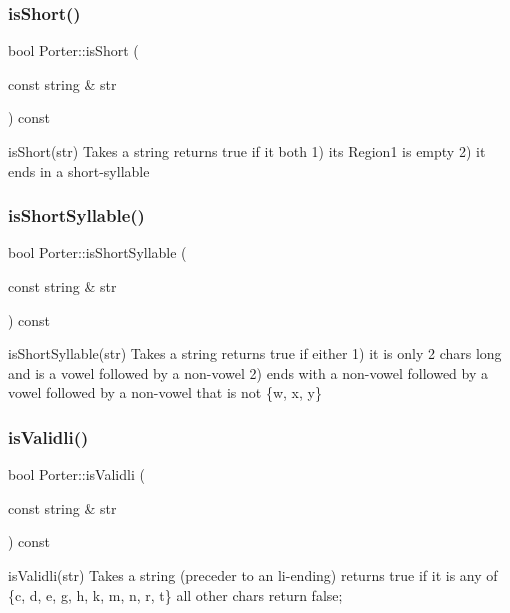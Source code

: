 \subsubsection{\texorpdfstring{is\+Short()}{isShort()}}
{\footnotesize\ttfamily bool Porter\+::is\+Short (\begin{DoxyParamCaption}\item[{const string \&}]{str }\end{DoxyParamCaption}) const}

is\+Short(str) Takes a string returns true if it both 1) its Region1 is empty 2) it ends in a short-\/syllable \mbox{\label{classPorter_a36e6678f68a4cc29371cc0111a8c8860}} 
\subsubsection{\texorpdfstring{is\+Short\+Syllable()}{isShortSyllable()}}
{\footnotesize\ttfamily bool Porter\+::is\+Short\+Syllable (\begin{DoxyParamCaption}\item[{const string \&}]{str }\end{DoxyParamCaption}) const}

is\+Short\+Syllable(str) Takes a string returns true if either 1) it is only 2 chars long and is a vowel followed by a non-\/vowel 2) ends with a non-\/vowel followed by a vowel followed by a non-\/vowel that is not \{\textquotesingle{}w\textquotesingle{}, \textquotesingle{}x\textquotesingle{}, \textquotesingle{}y\textquotesingle{}\} \mbox{\label{classPorter_ac53ad85d5d3178b72178a4d89137b55e}} 
\subsubsection{\texorpdfstring{is\+Validli()}{isValidli()}}
{\footnotesize\ttfamily bool Porter\+::is\+Validli (\begin{DoxyParamCaption}\item[{const string \&}]{str }\end{DoxyParamCaption}) const}

is\+Validli(str) Takes a string (preceder to an li-\/ending) returns true if it is any of \{\textquotesingle{}c\textquotesingle{}, \textquotesingle{}d\textquotesingle{}, \textquotesingle{}e\textquotesingle{}, \textquotesingle{}g\textquotesingle{}, \textquotesingle{}h\textquotesingle{}, \textquotesingle{}k\textquotesingle{}, \textquotesingle{}m\textquotesingle{}, \textquotesingle{}n\textquotesingle{}, \textquotesingle{}r\textquotesingle{}, \textquotesingle{}t\textquotesingle{}\} all other chars return false; \mbox{\label{classPorter_ab16d2762c47b86b9a161be3d2c44203e}} 
